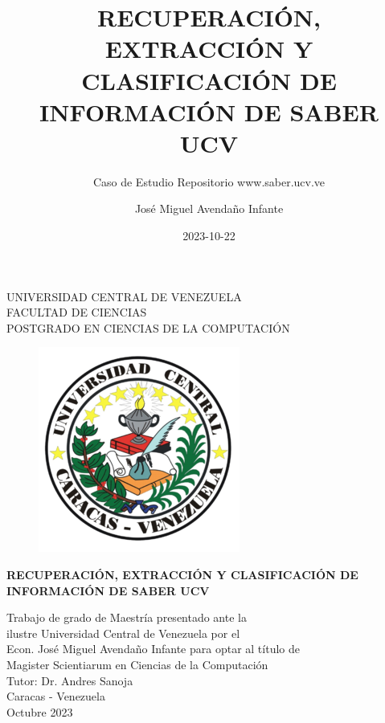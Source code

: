 \documentclass[
  10,
  openany]{book}
\title{RECUPERACIÓN, EXTRACCIÓN Y CLASIFICACIÓN DE INFORMACIÓN DE SABER UCV}
\subtitle{Caso de Estudio Repositorio www.saber.ucv.ve}
\author{José Miguel Avendaño Infante}
\date{2023-10-22}
\begin{document}
\maketitle

\thispagestyle{empty}
\begin{center}
	UNIVERSIDAD CENTRAL DE VENEZUELA\\
	FACULTAD DE CIENCIAS\\
	POSTGRADO EN CIENCIAS DE LA COMPUTACI\'ON\\

	\begin{figure}
						\centering
						  \includegraphics[height=.7\textwidth]{images/UCV.png}
  \end{figure}
  \vspace{1.5cm}
  \large{\textbf{RECUPERACI\'ON, EXTRACCI\'ON Y CLASIFICACI\'ON DE \\ INFORMACI\'ON DE SABER UCV}}

  \vspace{3cm}
  Trabajo de grado de Maestría presentado ante la \\
  ilustre Universidad Central de Venezuela por el\\
  Econ. José Miguel Avendaño Infante para  optar
  al título de \\Magister Scientiarum en Ciencias de la Computaci\'on\\
  \vspace{0.5cm}
  Tutor: Dr. Andres Sanoja\\
  \vspace{1.5cm}
  Caracas - Venezuela\\
  Octubre 2023
\end{center}
\end{document}
